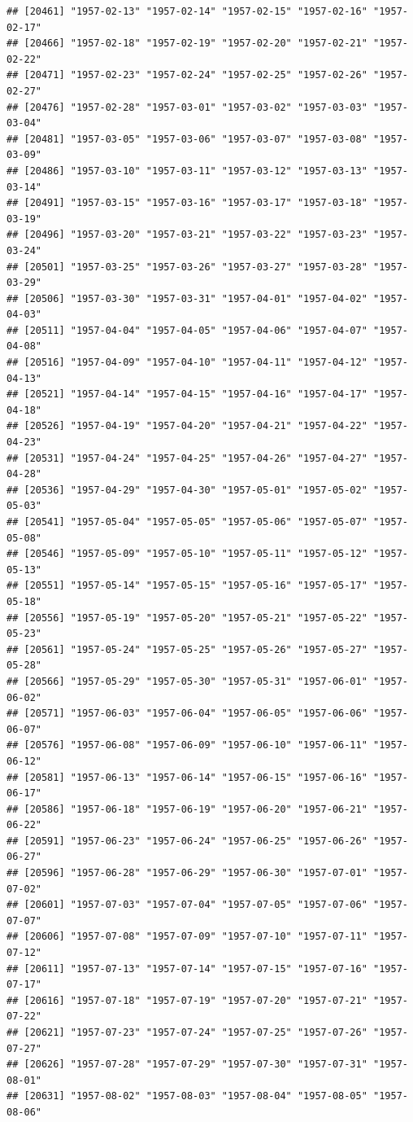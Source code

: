 \documentclass{article}\usepackage[]{graphicx}\usepackage[]{color}
\makeatletter
\newenvironment{kframe}{%
 \def\at@end@of@kframe{}%
 \ifinner\ifhmode%
  \def\at@end@of@kframe{\end{minipage}}%
  \begin{minipage}{\columnwidth}%
 \fi\fi%
 \def\FrameCommand##1{\hskip\@totalleftmargin \hskip-\fboxsep
 \colorbox{shadecolor}{##1}\hskip-\fboxsep
     \hskip-\linewidth \hskip-\@totalleftmargin \hskip\columnwidth}%
 \MakeFramed {\advance\hsize-\width
   \@totalleftmargin\z@ \linewidth\hsize
   \@setminipage}}%
 {\par\unskip\endMakeFramed%
 \at@end@of@kframe}
\newenvironment{knitrout}{}{} %
\makeatother
\begin{document}
\begin{description}
\begin{knitrout}
\begin{kframe}
\begin{verbatim}
## [20461] "1957-02-13" "1957-02-14" "1957-02-15" "1957-02-16" "1957-02-17"
## [20466] "1957-02-18" "1957-02-19" "1957-02-20" "1957-02-21" "1957-02-22"
## [20471] "1957-02-23" "1957-02-24" "1957-02-25" "1957-02-26" "1957-02-27"
## [20476] "1957-02-28" "1957-03-01" "1957-03-02" "1957-03-03" "1957-03-04"
## [20481] "1957-03-05" "1957-03-06" "1957-03-07" "1957-03-08" "1957-03-09"
## [20486] "1957-03-10" "1957-03-11" "1957-03-12" "1957-03-13" "1957-03-14"
## [20491] "1957-03-15" "1957-03-16" "1957-03-17" "1957-03-18" "1957-03-19"
## [20496] "1957-03-20" "1957-03-21" "1957-03-22" "1957-03-23" "1957-03-24"
## [20501] "1957-03-25" "1957-03-26" "1957-03-27" "1957-03-28" "1957-03-29"
## [20506] "1957-03-30" "1957-03-31" "1957-04-01" "1957-04-02" "1957-04-03"
## [20511] "1957-04-04" "1957-04-05" "1957-04-06" "1957-04-07" "1957-04-08"
## [20516] "1957-04-09" "1957-04-10" "1957-04-11" "1957-04-12" "1957-04-13"
## [20521] "1957-04-14" "1957-04-15" "1957-04-16" "1957-04-17" "1957-04-18"
## [20526] "1957-04-19" "1957-04-20" "1957-04-21" "1957-04-22" "1957-04-23"
## [20531] "1957-04-24" "1957-04-25" "1957-04-26" "1957-04-27" "1957-04-28"
## [20536] "1957-04-29" "1957-04-30" "1957-05-01" "1957-05-02" "1957-05-03"
## [20541] "1957-05-04" "1957-05-05" "1957-05-06" "1957-05-07" "1957-05-08"
## [20546] "1957-05-09" "1957-05-10" "1957-05-11" "1957-05-12" "1957-05-13"
## [20551] "1957-05-14" "1957-05-15" "1957-05-16" "1957-05-17" "1957-05-18"
## [20556] "1957-05-19" "1957-05-20" "1957-05-21" "1957-05-22" "1957-05-23"
## [20561] "1957-05-24" "1957-05-25" "1957-05-26" "1957-05-27" "1957-05-28"
## [20566] "1957-05-29" "1957-05-30" "1957-05-31" "1957-06-01" "1957-06-02"
## [20571] "1957-06-03" "1957-06-04" "1957-06-05" "1957-06-06" "1957-06-07"
## [20576] "1957-06-08" "1957-06-09" "1957-06-10" "1957-06-11" "1957-06-12"
## [20581] "1957-06-13" "1957-06-14" "1957-06-15" "1957-06-16" "1957-06-17"
## [20586] "1957-06-18" "1957-06-19" "1957-06-20" "1957-06-21" "1957-06-22"
## [20591] "1957-06-23" "1957-06-24" "1957-06-25" "1957-06-26" "1957-06-27"
## [20596] "1957-06-28" "1957-06-29" "1957-06-30" "1957-07-01" "1957-07-02"
## [20601] "1957-07-03" "1957-07-04" "1957-07-05" "1957-07-06" "1957-07-07"
## [20606] "1957-07-08" "1957-07-09" "1957-07-10" "1957-07-11" "1957-07-12"
## [20611] "1957-07-13" "1957-07-14" "1957-07-15" "1957-07-16" "1957-07-17"
## [20616] "1957-07-18" "1957-07-19" "1957-07-20" "1957-07-21" "1957-07-22"
## [20621] "1957-07-23" "1957-07-24" "1957-07-25" "1957-07-26" "1957-07-27"
## [20626] "1957-07-28" "1957-07-29" "1957-07-30" "1957-07-31" "1957-08-01"
## [20631] "1957-08-02" "1957-08-03" "1957-08-04" "1957-08-05" "1957-08-06"

\end{verbatim}
\end{kframe}
\end{knitrout}
\end{description}
\end{document}
